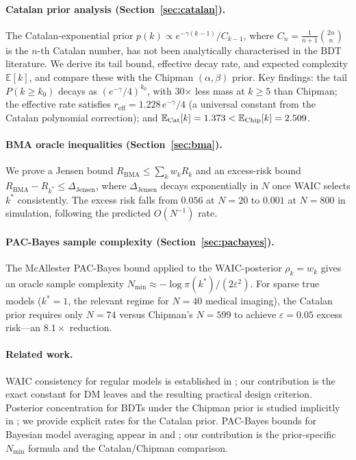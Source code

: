 \documentclass[ba]{imsart}
\theoremstyle{plain}
\theoremstyle{definition}
\theoremstyle{remark}
\newcommand{\Eop}{\mathbb{E}}
\newcommand{\Nmin}{N_{\min}}
\newcommand{\Cat}{\mathrm{Cat}}
\newcommand{\reff}{r_{\mathrm{eff}}}
\newcommand{\Rbma}{R_{\mathrm{BMA}}}
\newcommand{\Rora}{R_{k^*}}
\begin{document}
\paragraph{Catalan prior analysis (Section~\ref{sec:catalan}).}
The Catalan-exponential prior $p(k) \propto e^{-\gamma(k-1)}/C_{k-1}$,
where $C_n = \tfrac{1}{n+1}\binom{2n}{n}$ is the $n$-th Catalan number,
has not been analytically characterised in the BDT literature.
We derive its tail bound, effective decay rate, and expected complexity $\Eop[k]$,
and compare these with the Chipman $(\alpha,\beta)$ prior.
Key findings: the tail $P(k \geq k_0)$ decays as $(e^{-\gamma}/4)^{k_0}$,
with 30$\times$ less mass at $k \geq 5$ than Chipman;
the effective rate satisfies $\reff = 1.228\,e^{-\gamma}/4$ (a universal
constant from the Catalan polynomial correction);
and $\Eop_{\Cat}[k] = 1.373 < \Eop_{\rm Chip}[k] = 2.509$.

\paragraph{BMA oracle inequalities (Section~\ref{sec:bma}).}
We prove a Jensen bound $\Rbma \leq \sum_k w_k R_k$ and an excess-risk bound
$\Rbma - \Rora \leq \Delta_{\mathrm{Jensen}}$, where $\Delta_{\mathrm{Jensen}}$
decays exponentially in $N$ once WAIC selects $k^*$ consistently.
The excess risk falls from $0.056$ at $N=20$ to $0.001$ at $N=800$ in simulation,
following the predicted $O(N^{-1})$ rate.

\paragraph{PAC-Bayes sample complexity (Section~\ref{sec:pacbayes}).}
The McAllester PAC-Bayes bound \citep{mcallester1999,mcallester2003}
applied to the WAIC-posterior $\rho_k = w_k$ gives an oracle sample complexity
$\Nmin \approx -\log\pi(k^*) / (2\varepsilon^2)$.
For sparse true models ($k^*=1$, the relevant regime for $N=40$ medical imaging),
the Catalan prior requires only $N=74$ versus Chipman's $N=599$
to achieve $\varepsilon=0.05$ excess risk---an $8.1\times$ reduction.

\paragraph{Related work.}
WAIC consistency for regular models is established in \citet{watanabe2010};
our contribution is the exact constant for DM leaves and the resulting
practical design criterion.
Posterior concentration for BDTs under the Chipman prior is studied implicitly
in \citet{chipman1998}; we provide explicit rates for the Catalan prior.
PAC-Bayes bounds for Bayesian model averaging appear in \citet{seeger2002}
and \citet{maurer2004}; our contribution is the prior-specific $\Nmin$ formula
and the Catalan/Chipman comparison.
\end{document}

